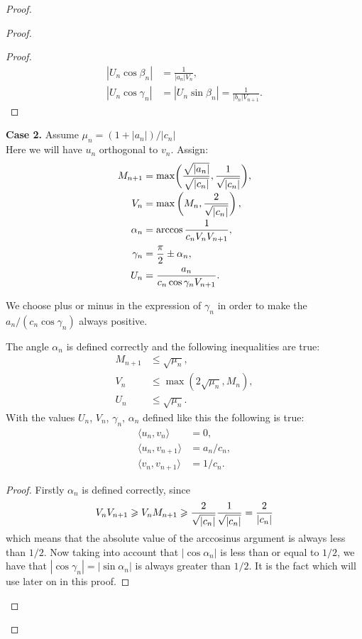 \documentclass[12pt]{amsart}
\theoremstyle{case}
\begin{document}
\begin{proof}
\begin{proof}
\begin{proof}
\begin{align*}
              |U_n \cos{\beta_n}| &= \frac{1}{|a_n|V_n},\\
              \left|U_n \cos{\gamma_n}\right| &= \left|U_n \sin{\beta_n}\right| = \frac{1}{|b_n|V_{n+1}}.
            \end{align*}
          \end{proof}
        \noindent\textbf{Case 2.} Assume $\mu_n = (1 + |a_n|)/|c_n|$\\
          Here we will have $u_n$ orthogonal to $v_n$.
          Assign:
          \begin{align*}
            M_{n+1} &= \max\biggl(\smash[b]{\frac{\sqrt{|a_n|}}{\sqrt{|c_n|}}}, \frac{1}{\sqrt{\smash[b]{|c_n|}}}\biggr),\\
            V_n &= \max\left(M_n, \frac{2}{\sqrt{\smash[b]{|c_n|}}}\right),\\
            \alpha_n &= \arccos{\frac{1}{c_n V_n V_{n+1}}},\\
            \gamma_n &= \frac{\pi}{2} \pm \alpha_n,\\
            U_n &= \frac{a_n}{c_n \cos{\gamma_n} V_{n+1}}.
          \end{align*}
          \begin{remark*}
            We choose plus or minus in the expression of $\gamma_n$ in order to make the $a_n/(c_n \cos{\gamma_n})$ always positive.
          \end{remark*}
          \begin{prop}
            The angle $\alpha_n$ is defined correctly and the following inequalities are true:
            \begin{align*}
                M_{n+1} &\leq \sqrt{\mu_n},\\
                V_n &\leq \max(2\sqrt{\mu_n}, M_n),\\
                U_n &\leq \sqrt{\mu_n}.
            \end{align*}
            With the values $U_n$, $V_n$, $\gamma_n$, $\alpha_n$ defined like this the following is true:
            \begin{align*}
              \langle u_n, v_n \rangle &= 0,\\
              \langle u_n, v_{n+1} \rangle &= a_n/c_n,\\
              \langle v_n, v_{n+1} \rangle &= 1/c_n.
            \end{align*}
          \end{prop}
          \begin{proof}
            Firstly $\alpha_n$ is defined correctly, since
            \[
              V_n V_{n+1} \geq V_n M_{n+1} \geq \frac{2}{\sqrt{\smash[b]{|c_n|}}} \frac{1}{\sqrt{\smash[b]{|c_n|}}} = \frac{2}{|c_n|}
            \]
            which means that the absolute value of the arccosinus argument is always less than $1/2$. Now taking into
            account that $|\cos{\alpha_n}|$ is less than or equal to $1/2$, we have that $|\cos{\gamma_n}| = |\sin{\alpha_n}|$ is always greater than $1/2$. It is the fact which will use later on in this proof.
            

\end{proof}
\end{proof}
\end{proof}
\end{document}
